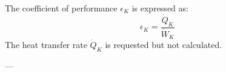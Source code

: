 The coefficient of performance \( \epsilon_K \) is expressed as:  
\[
\epsilon_K = \frac{\dot{Q}_K}{\dot{W}_K}
\]  
The heat transfer rate \( \dot{Q}_K \) is requested but not calculated.

---